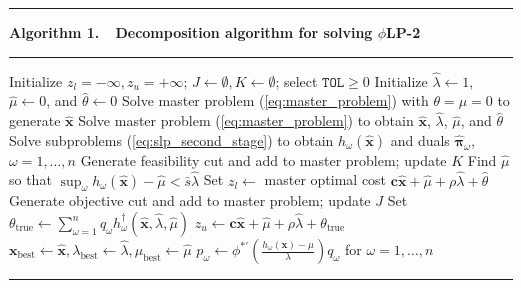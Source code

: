 \documentclass[opre,nonblindrev]{informs3} %
\newcommand{\x}{\mathbf{x}}
\newcommand{\xh}{\hat{\x}}
\newcommand{\bpi}{\mathbf{\pi}}
\newcommand{\bpih}{\hat{\bpi}}
\renewcommand{\c}{\mathbf{c}}
\newcommand{\plp}{$\phi$LP-2}
\begin{document}
\begin{center}
\begin{minipage}{.7\textwidth}
	\TableSpaced
	\hrule
	\vspace{1pt}
    {\bf \small Algorithm 1.\ \ Decomposition algorithm for solving \plp}
	\hrule
	\vspace{1pt}
	\begin{algorithmic}[1]
		\State Initialize $z_l = -\infty, z_u = +\infty$; $J \gets \emptyset, K \gets \emptyset$; select $\texttt{TOL}\geq 0$
		\State Initialize $\hat{\lambda} \gets 1$, $\hat{\mu} \gets 0$, and $\hat{\theta}\gets 0$  \label{l:init}
				\State Solve master problem (\ref{eq:master_problem}) with $\theta=\mu = 0$ to generate $\xh$
			\Else 
				\State Solve master problem (\ref{eq:master_problem}) to obtain $\xh$, $\hat{\lambda}$, $\hat{\mu}$, and $\hat{\theta}$
			\EndIf
			\State Solve subproblems (\ref{eq:slp_second_stage}) to obtain  $h_\omega(\xh)$ and duals $\bpih_\omega$, $\omega = 1, \ldots, n$
			\If{$\bar{s}< \infty$ and $\sup_\omega h_\omega(\xh) - \hat{\mu} > \bar{s}\hat{\lambda}$}
				\State Generate feasibility cut and add to master problem; update $K$
				\State Find $\hat{\mu}$ so that $\sup_\omega h_\omega(\xh) - \hat{\mu} < \bar{s}\hat{\lambda}$ \label{l:mu}
			\Else
				\State Set $z_l \gets$ master optimal cost $\c\xh + \hat{\mu} + \rho \hat{\lambda} + \hat{\theta}$
			\EndIf
			\State Generate objective cut and add to master problem; update $J$
			\State Set $\theta_{\text{true}} \gets \sum_{\omega=1}^n q_\omega h^{\dagger}_\omega(\xh,\hat{\lambda},\hat{\mu})$
			\If{$\c\xh + \hat{\mu} + \rho \hat{\lambda} + \theta_{\text{true}} < z_u$} \label{l:begin}
				\State $z_u \gets \c\xh + \hat{\mu} + \rho \hat{\lambda} + \theta_{\text{true}}$
				\State $\x_\text{best} \gets \xh, \lambda_\text{best} \gets \hat{\lambda}, \mu_\text{best} \gets \hat{\mu}$
				\State $p_\omega \gets \phi^{*\prime}(\tfrac{h_\omega(\x) - \mu}{\lambda}) q_\omega $ for $\omega = 1, \dots, n$  \label{l:end}
			\EndIf
		\EndWhile
	\end{algorithmic}
	\hrule
\end{minipage}
\end{center}
\medskip 
\end{document}
